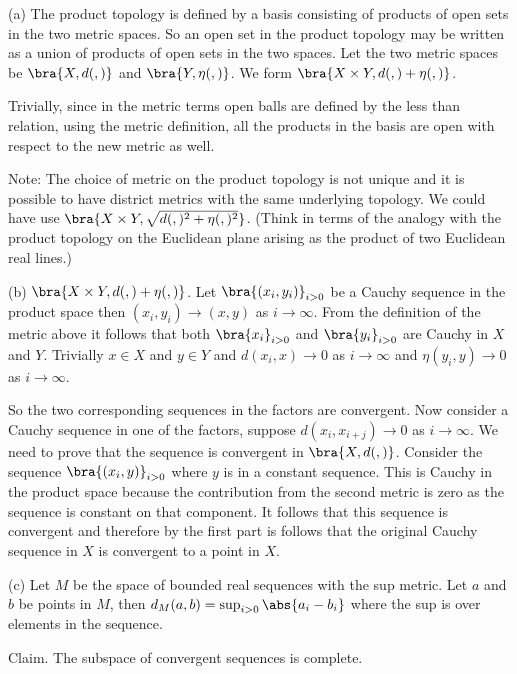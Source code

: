 \begin{solution}[\bf Solution.]
\ben
\item [(a)] The product topology is defined by a basis consisting of products of open sets in the two metric spaces. So an open set in the product topology may be written as a union of products of open sets in the two spaces. Let the two metric spaces be $\bra{X,d(,)}$ and $\bra{Y,\eta(,)}$. We form $\bra{X\times Y, d(,)+\eta(,)}$.

Trivially, since in the metric terms open balls are defined by the less than relation, using the metric definition, all the products in the basis are open with respect to the new metric as well.

Note: The choice of metric on the product topology is not unique and it is possible to have district metrics with the same underlying topology. We could have use $\bra{X\times Y, \sqrt{d(,)^2 + \eta(,)^2}}$. (Think in terms of the analogy with the product topology on the Euclidean plane arising as the product of two Euclidean real lines.)

\item [(b)] $\bra{X\times Y, d(,)+\eta(,)}$. Let $\bra{(x_i,y_i)}_{i>0}$ be a Cauchy sequence in the product space then $(x_i,y_i) \to (x,y)$ as $i\to \infty$. From the definition of the metric above it follows that both $\bra{x_i}_{i>0}$ and $\bra{y_i}_{i>0}$ are Cauchy in $X$ and $Y$. Trivially $x\in X$ and $y\in Y$ and $d(x_i,x)\to 0$ as $i \to \infty$ and $\eta(y_i,y)\to 0$ as $i\to \infty$.

So the two corresponding sequences in the factors are convergent. Now consider a Cauchy sequence in one of the factors, suppose $d(x_i,x_{i+j}) \to 0$ as $i \to \infty$. We need to prove that the sequence is convergent in $\bra{X,d(,)}$. Consider the sequence $\bra{(x_i,y)}_{i>0}$ where $y$ is in a constant sequence. This is Cauchy in the product space because the contribution from the second metric is zero as the sequence is constant on that component. It follows that this sequence is convergent and therefore by the first part is follows that the original Cauchy sequence in $X$ is convergent to a point in $X$.

\item [(c)] Let $M$ be the space of bounded real sequences with the sup metric. Let $a$ and $b$ be points in $M$, then $d_M(a,b) = \sup_{i>0}\abs{a_i-b_i}$ where the sup is over elements in the sequence.

Claim. The subspace of convergent sequences is complete.


\end{solution}
